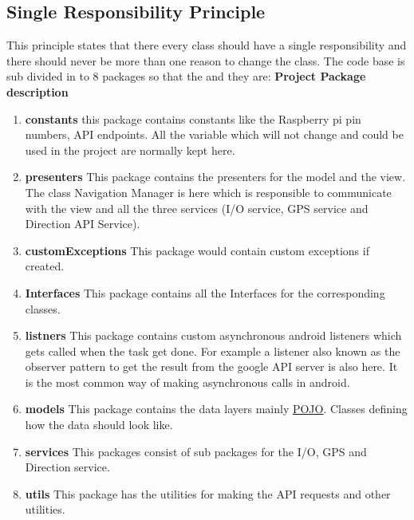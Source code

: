     \subsection{Single Responsibility Principle}
    This principle states that there every class should have a single responsibility
    and there should never be more than one reason to change the class. 
    The code base is sub divided in to 8 packages so that the  and they are:
    \newpage
    \textbf{Project Package description}
    \begin{enumerate}
        \item 
            \textbf{constants} 
                this package contains constants like the Raspberry pi pin 
                numbers, API endpoints. All the variable which will not 
                change and could be used in the project are normally kept here.
        \item 
            \textbf{presenters} 
                This package contains the presenters for the model and the view.
                The class Navigation Manager is here which is responsible to communicate
                with the view and all the three services (I/O service, GPS service and 
                Direction API Service).  
        \item 
            \textbf{customExceptions}
                This package would contain custom exceptions if created.
        \item 
            \textbf{Interfaces}
                This package contains all the Interfaces for the corresponding classes. 
        \item 
            \textbf{listners}
                This package contains custom asynchronous android listeners which gets 
                called when the task get done. For example a listener also known as the
                observer pattern \cite{Hotop2015} to get the result
                from the google API server is also here. It is the most common way of
                making asynchronous calls in android.
        \item 
            \textbf{models}
            This package contains the data layers mainly 
            \href{https://spring.io/understanding/POJO}  {POJO}. Classes defining how the
            data should look like.
        \item 
            \textbf{services} 
                This packages consist of sub packages for the I/O, GPS and Direction service.
        \item 
            \textbf{utils}
                This package has the utilities for making the API requests and other utilities. 
    \end{enumerate}


